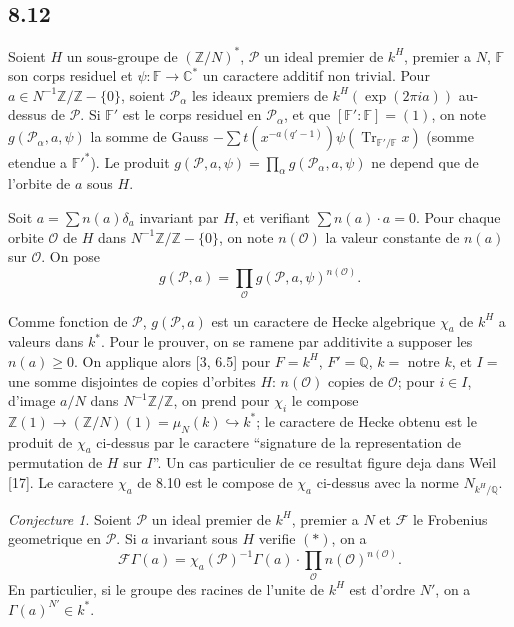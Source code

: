 \documentclass[12pt,a4paper]{article}
\theoremstyle{plain}
\theoremstyle{definition}
\theoremstyle{remark}
\newtheorem{conjecture}[definition]{Conjecture}
\DeclareMathOperator{\Tr}{Tr}
\newcommand{\Q}{\mathbb{Q}}
\newcommand{\C}{\mathbb{C}}
\newcommand{\Z}{\mathbb{Z}}
\begin{document}
\subsection*{8.12}

Soient $H$ un sous-groupe de $(\Z/N)^*$, $\mathcal{P}$ un ideal premier de $k^H$, premier a $N$,
$\mathbb{F}$ son corps residuel et $\psi: \mathbb{F} \to \C^*$ un caractere additif non trivial. Pour
$a \in N^{-1}\Z/\Z - \{0\}$, soient $\mathcal{P}_\alpha$ les ideaux premiers de $k^H(\exp(2\pi i a))$
au-dessus de $\mathcal{P}$. Si $\mathbb{F}'$ est le corps residuel en $\mathcal{P}_\alpha$, et que $[\mathbb{F}':\mathbb{F}] = (1)$, on
note $g(\mathcal{P}_\alpha, a, \psi)$ la somme de Gauss $-\sum t(x^{-a(q'-1)}) \psi(\Tr_{\mathbb{F}'/\mathbb{F}} x)$
(somme etendue a $\mathbb{F}'^*$). Le produit $g(\mathcal{P}, a, \psi) = \prod_\alpha g(\mathcal{P}_\alpha, a, \psi)$ ne
depend que de l'orbite de $a$ sous $H$.

Soit $a = \sum n(a) \delta_a$ invariant par $H$, et verifiant $\sum n(a) \cdot a = 0$. Pour chaque
orbite $\mathcal{O}$ de $H$ dans $N^{-1}\Z/\Z - \{0\}$, on note $n(\mathcal{O})$ la valeur constante de $n(a)$ sur
$\mathcal{O}$. On pose
\[
g(\mathcal{P}, a) = \prod_{\mathcal{O}} g(\mathcal{P}, a, \psi)^{n(\mathcal{O})}.
\]

Comme fonction de $\mathcal{P}$, $g(\mathcal{P}, a)$ est un caractere de Hecke algebrique $\chi_a$ de $k^H$ a
valeurs dans $k^*$. Pour le prouver, on se ramene par additivite a supposer les
$n(a) \geq 0$. On applique alors [3, 6.5] pour $F = k^H$, $F' = \Q$, $k =$ notre $k$, et
$I =$ une somme disjointes de copies d'orbites $H$: $n(\mathcal{O})$ copies de $\mathcal{O}$; pour $i \in I$,
d'image $a/N$ dans $N^{-1}\Z/\Z$, on prend pour $\chi_i$ le compose
$\Z(1) \to (\Z/N)(1) = \mu_N(k) \hookrightarrow k^*$; le caractere de Hecke obtenu est le produit
de $\chi_a$ ci-dessus par le caractere ``signature de la representation de permutation
de $H$ sur $I$''. Un cas particulier de ce resultat figure deja dans Weil [17]. Le
caractere $\chi_a$ de 8.10 est le compose de $\chi_a$ ci-dessus avec la norme $N_{k^H/\Q}$.

\begin{conjecture}\label{conj:8.13}
Soient $\mathcal{P}$ un ideal premier de $k^H$, premier a $N$ et $\mathcal{F}$ le Frobenius
geometrique en $\mathcal{P}$. Si $a$ invariant sous $H$ verifie $(*)$, on a
\[
\mathcal{F} \Gamma(a) = \chi_a(\mathcal{P})^{-1} \Gamma(a) \cdot \prod_{\mathcal{O}} n(\mathcal{O})^{n(\mathcal{O})}.
\]
En particulier, si le groupe des racines de l'unite de $k^H$ est d'ordre $N'$, on a
$\Gamma(a)^{N'} \in k^*$.
\end{conjecture}
\end{document}
